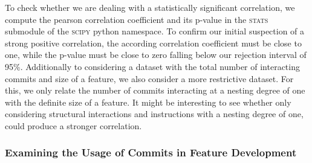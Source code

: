 To check whether we are dealing with a statistically significant correlation, we compute the pearson correlation coefficient and its p-value in the \textsc{stats} submodule of the \textsc{scipy} python namespace.
To confirm our initial suspection of a strong positive correlation, the according correlation coefficient must be close to one, while the p-value must be close to zero falling below our rejection interval of 95\%.
Additionally to considering a dataset with the total number of interacting commits and size of a feature, we also consider a more restrictive dataset.
For this, we only relate the number of commits interacting at a nesting degree of one with the definite size of a feature.
It might be interesting to see whether only considering structural interactions and instructions with a nesting degree of one, could produce a stronger correlation.

\subsubsection*{Examining the Usage of Commits in Feature Development}

